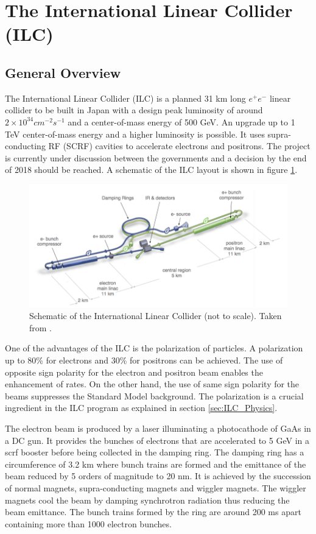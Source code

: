 \section{The International Linear Collider (ILC)}
\label{sec:ILC}

\subsection{General Overview}

The International Linear Collider (ILC) is a planned 31 km long $e^+e^-$ linear collider to be built in Japan with a design peak luminosity of around $2 \times 10^{34} cm^{-2}s^{-1}$ and a center-of-mass energy of 500 GeV. An upgrade up to 1 TeV center-of-mass energy and a higher luminosity is possible. It uses supra-conducting RF (SCRF) cavities to accelerate electrons and positrons. The project is currently under discussion between the governments and a decision by the end of 2018 should be reached. A schematic of the ILC layout is shown in figure \ref{fig:ILC_schematic}.

\begin{figure}[htbp!]
  \centering
  \includegraphics[width=0.7\linewidth]{chap2/fig/ILC_schematic.png}
  \caption{Schematic of the International Linear Collider (not to scale). Taken from \cite{ILC_TDR_Vol1}.} \label{fig:ILC_schematic}
\end{figure}

One of the advantages of the ILC is the polarization of particles. A polarization up to 80\% for electrons and 30\% for positrons can be achieved. The use of opposite sign polarity for the electron and positron beam enables the enhancement of rates. On the other hand, the use of same sign polarity for the beams suppresses the Standard Model background. The polarization is a crucial ingredient in the ILC program as explained in section \ref{sec:ILC_Physics}.

The electron beam is produced by a laser illuminating a photocathode of GaAs in a DC gun. It provides the bunches of electrons that are accelerated to 5 GeV in a \acrshort{scrf} booster before being collected in the damping ring. The damping ring has a circumference of 3.2 km where bunch trains are formed and the emittance of the beam reduced by 5 orders of magnitude to 20 nm. It is achieved by the succession of normal magnets, supra-conducting magnets and wiggler magnets. The wiggler magnets cool the beam by damping synchrotron radiation thus reducing the beam emittance. The bunch trains formed by the ring are around 200 ms apart containing more than 1000 electron bunches.

